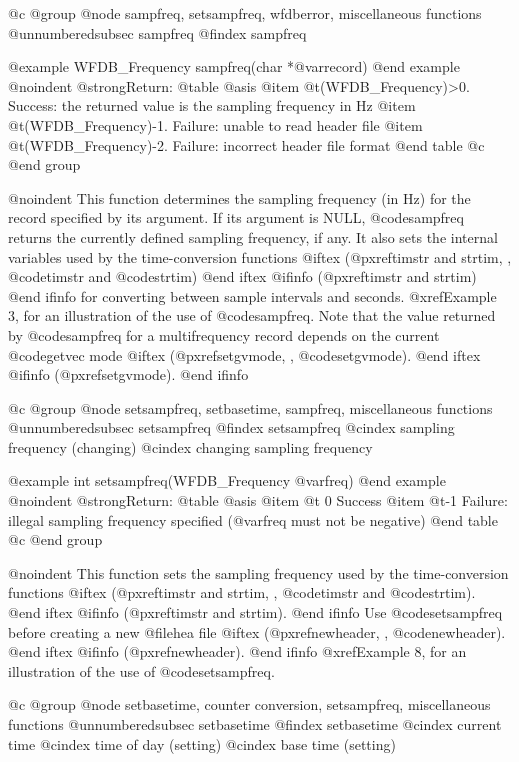 {{{{{{{{{@c @group
@node     sampfreq, setsampfreq, wfdberror, miscellaneous functions
@unnumberedsubsec sampfreq
@findex sampfreq

@example
WFDB_Frequency sampfreq(char *@var{record})
@end example
@noindent
@strong{Return:}
@table @asis
@item @t{(WFDB_Frequency)>0.}
Success: the returned value is the sampling frequency in Hz
@item @t{(WFDB_Frequency)-1.}
Failure: unable to read header file
@item @t{(WFDB_Frequency)-2.}
Failure: incorrect header file format
@end table
@c @end group

@noindent
This function determines the sampling frequency (in Hz) for the record
specified by its argument.  If its argument is NULL, @code{sampfreq}
returns the currently defined sampling frequency, if any.  It also sets
the internal variables used by the time-conversion functions
@iftex
(@pxref{timstr and strtim, , @code{timstr} and @code{strtim}})
@end iftex
@ifinfo
(@pxref{timstr and strtim})
@end ifinfo
for converting between sample intervals and seconds.  @xref{Example 3},
for an illustration of the use of @code{sampfreq}.  Note that the value
returned by @code{sampfreq} for a multifrequency record depends on the
current @code{getvec} mode
@iftex
(@pxref{setgvmode, , @code{setgvmode}}).
@end iftex
@ifinfo
(@pxref{setgvmode}).
@end ifinfo

@c @group
@node     setsampfreq, setbasetime, sampfreq, miscellaneous functions
@unnumberedsubsec setsampfreq
@findex setsampfreq
@cindex sampling frequency (changing)
@cindex changing sampling frequency

@example
int setsampfreq(WFDB_Frequency @var{freq})
@end example
@noindent
@strong{Return:}
@table @asis
@item @t{ 0}
Success
@item @t{-1}
Failure:  illegal sampling frequency specified (@var{freq} must not be
negative)
@end table
@c @end group

@noindent
This function sets the sampling frequency used by the time-conversion
functions
@iftex
(@pxref{timstr and strtim, , @code{timstr} and @code{strtim}}).
@end iftex
@ifinfo
(@pxref{timstr and strtim}).
@end ifinfo
Use @code{setsampfreq} before creating a new @file{hea} file
@iftex
(@pxref{newheader, , @code{newheader}}).
@end iftex
@ifinfo
(@pxref{newheader}).
@end ifinfo
@xref{Example 8}, for an illustration of the use of @code{setsampfreq}.

@c @group
@node     setbasetime, counter conversion, setsampfreq, miscellaneous functions
@unnumberedsubsec setbasetime
@findex setbasetime
@cindex current time
@cindex time of day (setting)
@cindex base time (setting)

}}}}}}}}}

